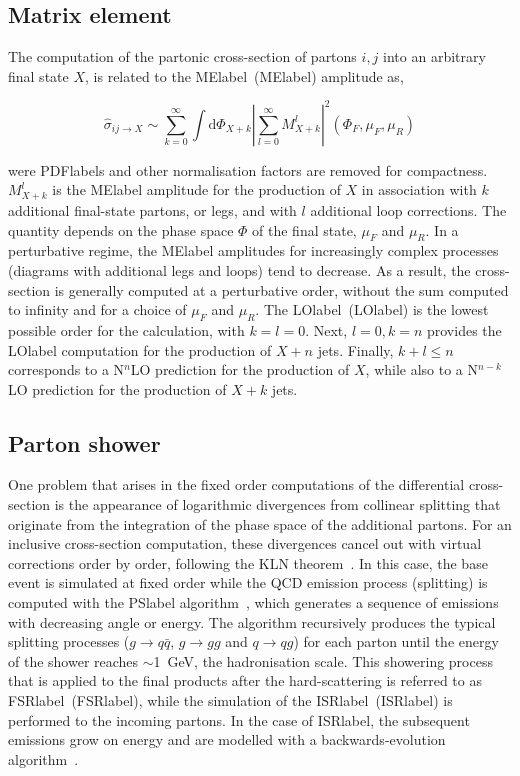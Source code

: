 \subsection{Matrix element}

The computation of the partonic cross-section of partons $i,j$ into an arbitrary final state $X$, is related to the \acrlong{MElabel}~(\acrshort{MElabel}) amplitude as,

\begin{equation}
    \hat{\sigma}_{ij\to X} \sim \sum_{k=0}^{\infty} \int \text{d}\Phi_{X+k}\left|\sum_{l=0}^{\infty} M^l_{X+k}\right|^2(\Phi_F,\mu_F,\mu_R)
\end{equation}

were \acrshort{PDFlabel}s and other normalisation factors are removed for compactness. $M^l_{X+k}$ is the \acrshort{MElabel} amplitude for the production of $X$ in association with $k$ additional final-state partons, or legs, and with $l$ additional loop corrections. The quantity depends on the phase space $\Phi$ of the final state, $\mu_F$ and $\mu_R$. In a perturbative regime, the \acrshort{MElabel} amplitudes for increasingly complex processes (diagrams with additional legs and loops) tend to decrease. As a result, the cross-section is generally computed at a perturbative order, without the sum computed to infinity and for a choice of $\mu_F$ and $\mu_R$. The \acrlong{LOlabel}~(\acrshort{LOlabel}) is the lowest possible order for the calculation, with $k=l=0$. Next, $l=0,k=n$ provides the \acrshort{LOlabel} computation for the production of $X+n$ jets. Finally, $k+l\leq n$ corresponds to a N$^n$LO prediction for the production of $X$, while also to a N$^{n-k}$LO prediction for the production of $X+k$ jets.

\subsection{Parton shower}

One problem that arises in the fixed order computations of the differential cross-section is the appearance of logarithmic divergences from collinear splitting that originate from the integration of the phase space of the additional partons. For an inclusive cross-section computation, these divergences cancel out with virtual corrections order by order, following the KLN theorem~\cite{Masssingularities,PhysRev.133.B1549}.
In this case, the base event is simulated at fixed order while the \acrshort{QCD} emission process (splitting) is computed with the \acrshort{PSlabel} algorithm~\cite{FOX1980285}, 
which generates a sequence of emissions with decreasing angle or energy. The algorithm recursively produces the typical splitting processes ($g\to q\bar{q}$, $g\to gg$ and $q\to qg$) for each parton until the energy of the shower reaches $\sim$1~GeV, the hadronisation scale. This showering process that is applied to the final products after the hard-scattering is referred to as \acrlong{FSRlabel}~(\acrshort{FSRlabel}), while the simulation of the \acrlong{ISRlabel}~(\acrshort{ISRlabel}) is performed to the incoming partons. In the case of \acrshort{ISRlabel}, the subsequent emissions grow on energy and are modelled with a backwards-evolution algorithm~\cite{SJOSTRAND1985321}. 

